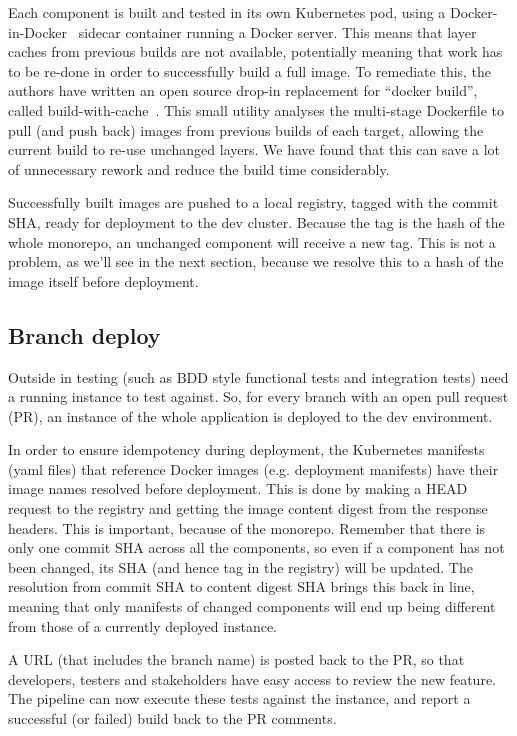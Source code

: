 \documentclass[reprint,amsmath,amssymb,aps]{revtex4-1}
\begin{document}
Each component is built and tested in its own Kubernetes pod, using a Docker-in-Docker~\cite{libraryd61:online} sidecar container running a Docker server. This means that layer caches from previous builds are not available, potentially meaning that work has to be re-done in order to successfully build a full image. To remediate this, the authors have written an open source drop-in replacement for “docker build”, called build-with-cache~\cite{redbadge83:online}. This small utility analyses the multi-stage Dockerfile to pull (and push back) images from previous builds of each target, allowing the current build to re-use unchanged layers. We have found that this can save a lot of unnecessary rework and reduce the build time considerably.

Successfully built images are pushed to a local registry, tagged with the commit SHA, ready for deployment to the dev cluster. Because the tag is the hash of the whole monorepo, an unchanged component will receive a new tag. This is not a problem, as we’ll see in the next section, because we resolve this to a hash of the image itself before deployment.

\subsection{\label{sec:branchdeploy}Branch deploy}

Outside in testing (such as BDD style functional tests and integration tests) need a running instance to test against. So, for every branch with an open pull request (PR), an instance of the whole application is deployed to the dev environment.

In order to ensure idempotency during deployment, the Kubernetes manifests (yaml files) that reference Docker images (e.g. deployment manifests) have their image names resolved before deployment. This is done by making a HEAD request to the registry and getting the image content digest from the response headers. This is important, because of the monorepo. Remember that there is only one commit SHA across all the components, so even if a component has not been changed, its SHA (and hence tag in the registry) will be updated. The resolution from commit SHA to content digest SHA brings this back in line, meaning that only manifests of changed components will end up being different from those of a currently deployed instance.

A URL (that includes the branch name) is posted back to the PR, so that developers, testers and stakeholders have easy access to review the new feature. The pipeline can now execute these tests against the instance, and report a successful (or failed) build back to the PR comments.
\end{document}
